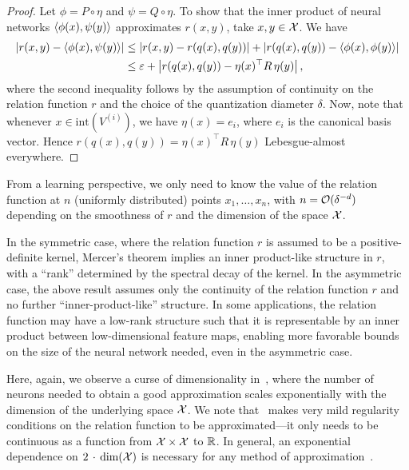 \begin{proof}
    Let $\phi = P \circ \eta$ and $\psi = Q \circ \eta$. To show that the inner product of neural networks $\left \langle \phi(x), \psi(y) \right\rangle$ approximates $r(x, y)$, take $x, y \in {\mathcal{X}}$. We have
    \begin{align*}
        \left\lvert r(x, y) - \left \langle \phi(x), \psi(y) \right\rangle\right\rvert &\leq \left\lvert r(x, y) - r(q(x), q(y))\right\rvert + \left\lvert r(q(x), q(y)) - \left \langle \phi(x), \phi(y) \right\rangle\right\rvert\\
        &\leq \varepsilon + \left\lvert r(q(x), q(y)) - \eta(x)^\top R\, \eta(y)\right\rvert,
    \end{align*}
    where the second inequality follows by the assumption of continuity on the relation function $r$ and the choice of the quantization diameter $\delta$. Now, note that whenever $x \in \mathrm{int}(V^{(i)})$, we have $\eta(x) = e_i$, where $e_i$ is the canonical basis vector. Hence $r(q(x), q(y)) = \eta(x)^\top R\, \eta(y)$ Lebesgue-almost everywhere. 
\end{proof}

\begin{remark}
    From a learning perspective, we only need to know the value of the relation function at $n$ (uniformly distributed) points $x_1, \ldots, x_n$, with $n = {\mathcal{O}}(\delta^{-d})$ depending on the smoothness of $r$ and the dimension of the space ${\mathcal{X}}$.
\end{remark}

\begin{remark}
    In the symmetric case, where the relation function $r$ is assumed to be a positive-definite kernel, Mercer's theorem implies an inner product-like structure in $r$, with a ``rank'' determined by the spectral decay of the kernel. In the asymmetric case, the above result assumes only the continuity of the relation function $r$ and no further ``inner-product-like'' structure. In some applications, the relation function may have a low-rank structure such that it is representable by an inner product between low-dimensional feature maps, enabling more favorable bounds on the size of the neural network needed, even in the asymmetric case.
\end{remark}

Here, again, we observe a curse of dimensionality in~, where the number of neurons needed to obtain a good approximation scales exponentially with the dimension of the underlying space ${\mathcal{X}}$. We note that~ makes very mild regularity conditions on the relation function to be approximated---it only needs to be continuous as a function from ${\mathcal{X}} \times {\mathcal{X}}$ to $\mathbb{R}$. In general, an exponential dependence on $2\,\cdot\, \dim({\mathcal{X}})$ is necessary for any method of approximation~\citep{pinkus1999approximation,devore1998nonlinear,maiorov1999lower,maiorov2000near,poggioWhyWhenCan2017}.

